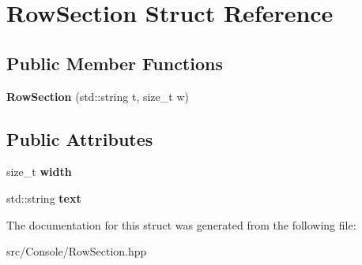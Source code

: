 \hypertarget{struct_row_section}{}\section{Row\+Section Struct Reference}
\label{struct_row_section}
\subsection*{Public Member Functions}
\begin{DoxyCompactItemize}
\item 
\mbox{\label{struct_row_section_a979e15cb3d9148a02fea22c0d7c460c4}} 
{\bfseries Row\+Section} (std\+::string t, size\+\_\+t w)
\end{DoxyCompactItemize}
\subsection*{Public Attributes}
\begin{DoxyCompactItemize}
\item 
\mbox{\label{struct_row_section_a6c926e103f5d00ee919a6b4dad059d06}} 
size\+\_\+t {\bfseries width}
\item 
\mbox{\label{struct_row_section_ab65f01d11d6c694ae48637f070f9607f}} 
std\+::string {\bfseries text}
\end{DoxyCompactItemize}


The documentation for this struct was generated from the following file\+:\begin{DoxyCompactItemize}
\item 
src/\+Console/Row\+Section.\+hpp\end{DoxyCompactItemize}
